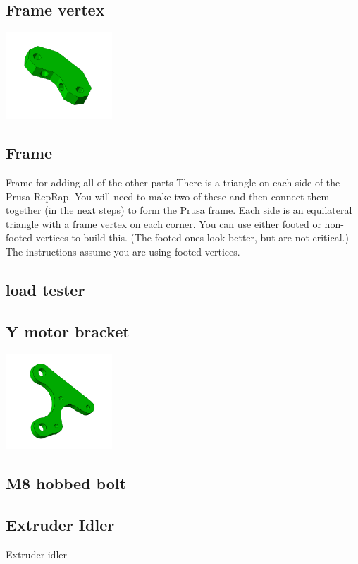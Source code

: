 \documentclass[11pt]{article}
\begin{document}
\hypertarget{thing_frame-vertex}{\subsection{Frame vertex}}
\includegraphics[width=4cm]{images/frame-vertex.jpg}

\hypertarget{thing_frame}{\subsection{Frame}}
Frame for adding all of the other parts
There is a triangle on each side of the Prusa RepRap. You will need to make two of these and then connect them together (in the next steps) to form the Prusa frame. Each side is an equilateral triangle with a frame vertex on each corner. You can use either footed or non-footed vertices to build this. (The footed ones look better, but are not critical.) The instructions assume you are using footed vertices.

\hypertarget{thing_loadtester}{\subsection{load tester}}

\hypertarget{thing_y-motor-bracket}{\subsection{Y motor bracket}}
\includegraphics[width=4cm]{images/y-motor-bracket.jpg}

\hypertarget{thing_hobbed-bolt}{\subsection{M8 hobbed bolt}}

\hypertarget{thing_idler}{\subsection{Extruder Idler}}
Extruder idler
\end{document}
